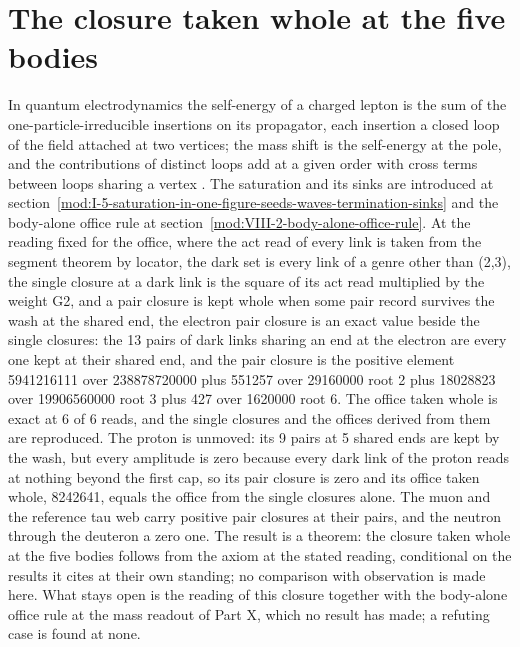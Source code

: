 \section{The closure taken whole at the five bodies}\label{mod:I-5-D539571-epcl-t1}
In quantum electrodynamics the self-energy of a charged lepton is the sum of the one-particle-irreducible insertions on its propagator, each insertion a closed loop of the field attached at two vertices; the mass shift is the self-energy at the pole, and the contributions of distinct loops add at a given order with cross terms between loops sharing a vertex \cite{Dyson1949,Peskin1995}. The saturation and its sinks are introduced at section~\ref{mod:I-5-saturation-in-one-figure-seeds-waves-termination-sinks} and the body-alone office rule at section~\ref{mod:VIII-2-body-alone-office-rule}.
At the reading fixed for the office, where the act read of every link is taken from the segment theorem by locator, the dark set is every link of a genre other than (2,3), the single closure at a dark link is the square of its act read multiplied by the weight G2, and a pair closure is kept whole when some pair record survives the wash at the shared end, the electron pair closure is an exact value beside the single closures: the 13 pairs of dark links sharing an end at the electron are every one kept at their shared end, and the pair closure is the positive element 5941216111 over 238878720000 plus 551257 over 29160000 root 2 plus 18028823 over 19906560000 root 3 plus 427 over 1620000 root 6.
The office taken whole is exact at 6 of 6 reads, and the single closures and the offices derived from them are reproduced. The proton is unmoved: its 9 pairs at 5 shared ends are kept by the wash, but every amplitude is zero because every dark link of the proton reads at nothing beyond the first cap, so its pair closure is zero and its office taken whole, 8242641, equals the office from the single closures alone. The muon and the reference tau web carry positive pair closures at their pairs, and the neutron through the deuteron a zero one.
The result is a theorem: the closure taken whole at the five bodies follows from the axiom at the stated reading, conditional on the results it cites at their own standing; no comparison with observation is made here.
What stays open is the reading of this closure together with the body-alone office rule at the mass readout of Part X, which no result has made; a refuting case is found at none.
